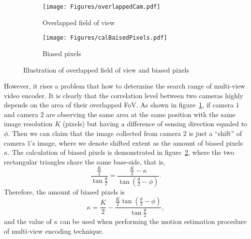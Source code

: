 \begin{figure}
\begin{center}
\begin{subfigure}[b]{0.65\columnwidth}
\texttt{[image: Figures/overlappedCam.pdf]}
\caption{\label{fig::overlappedCam}Overlapped field of view}
\end{subfigure}
\begin{subfigure}[b]{0.5\columnwidth}
\texttt{[image: Figures/calBaisedPixels.pdf]}
\caption{\label{fig::calBaisedPixels}Biased pixels}
\end{subfigure}
\caption{\label{fig::overlappedAndBaised}Illustration of overlapped field of view and biased pixels}
\end{center}
\end{figure}
%
However, it rises a problem that how to determine the search range of multi-view video encoder.
It is clearly that the correlation level between two cameras highly depends on the area of their overlapped FoV.
As shown in figure~\ref{fig::overlappedCam}, if camera $1$ and camera $2$ are observing the same area at the same position with the same image resolution $K$ (pixels) but having a difference of sensing direction equaled to $\phi$.
Then we can claim that the image collected from camera $2$ is just a ``shift'' of camera $1$'s image, where we denote shifted extent as the amount of biased pixels $\kappa$.
The calculation of biased pixels is demonstrated in figure~\ref{fig::calBaisedPixels}, where the two rectangular triangles share the same base-side, that is,
\begin{equation}
\frac{\frac{K}{2}}{\tan \frac{\theta}{2}} = \frac{\frac{K}{2}-\kappa}{\tan(\frac{\theta}{2}-\phi)}.
\label{eq::calBiasedPixels}
\end{equation}
Therefore, the amount of biased pixels is
\begin{equation}
\kappa = \frac{K}{2} - \frac{\frac{K}{2} \tan(\frac{\theta}{2}-\phi) }{\tan \frac{\theta}{2}},
\label{eq::biasedPixels}
\end{equation}
and the value of $\kappa$ can be used when performing the motion estimation procedure of multi-view encoding technique.
%
